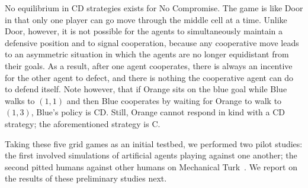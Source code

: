 No equilibrium in CD strategies exists for No Compromise.  The game
is like Door in that only one player can go move through the middle
cell at a time.  Unlike Door, however, it is not possible for the
agents to simultaneously maintain a defensive position and to signal
cooperation, because any cooperative move leads to an asymmetric
situation in which the agents are no longer equidistant from their
goals.
As a result, after one agent cooperates, there is always an incentive
for the other agent to defect, and there is nothing the cooperative
agent can do to defend itself.  Note however, that if Orange sits on
the blue goal while Blue walks to $(1,1)$ and then Blue cooperates by
waiting for Orange to walk to $(1,3)$, Blue's policy is CD.  Still,
Orange cannot respond in kind with a CD strategy; the aforementioned
strategy is C.

Taking these five grid games as an initial testbed, we performed two
pilot studies: the first involved simulations of artificial agents
playing against one another; the second pitted humans against other
humans on Mechanical Turk~\cite{}.
We report on the results of these preliminary studies next.

